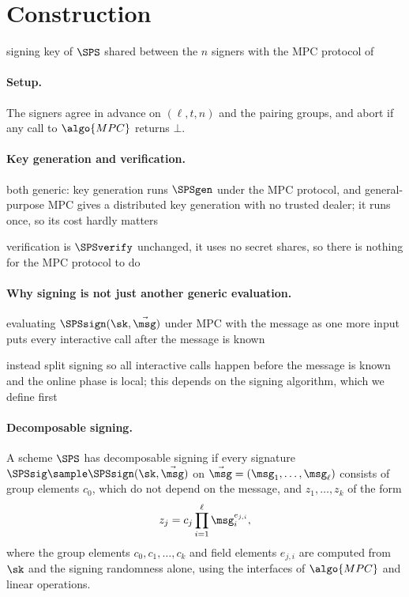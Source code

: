 \section{Construction}\label{sec:tsps-construction}

\begin{outline}
  \item signing key of $\SPS$ shared between the $n$ signers with the MPC
protocol of 
\end{outline}

\paragraph{Setup.} The signers agree in advance on $(\ell, t, n)$ and the
pairing groups, and abort if any call to $\algo{MPC}$ returns $\bot$.

\paragraph{Key generation and verification.}
\begin{outline}
  \item both generic: key generation runs $\SPSgen$ under the MPC protocol, and
general-purpose MPC gives a distributed key generation with no trusted dealer;
it runs once, so its cost hardly matters
  \item verification is $\SPSverify$ unchanged, it uses no secret shares, so
there is nothing for the MPC protocol to do
\end{outline}

\paragraph{Why signing is not just another generic evaluation.}
\begin{outline}
  \item evaluating $\SPSsign(\sk, \vec{\msg})$ under MPC with the message as one
more input puts every interactive call after the message is known
  \item instead split signing so all interactive calls happen before the message
is known and the online phase is local; this depends on the signing algorithm,
which we define first
\end{outline}

\paragraph{Decomposable signing.} A scheme $\SPS$ has decomposable signing if every
signature $\SPSsig \sample \SPSsign(\sk, \vec{\msg})$ on $\vec{\msg} = (\msg_1,
\ldots, \msg_\ell)$ consists of group elements $c_0$, which do not depend on the
message, and $z_1, \ldots, z_k$ of the form
%
\begin{equation*}
%
  z_j = c_j \prod_{i=1}^{\ell} \msg_i^{e_{j,i}},
%
\end{equation*}
%
where the group elements $c_0, c_1, \ldots, c_k$ and field elements $e_{j,i}$
are computed from $\sk$ and the signing randomness alone, using the interfaces
of $\algo{MPC}$ and linear operations.

